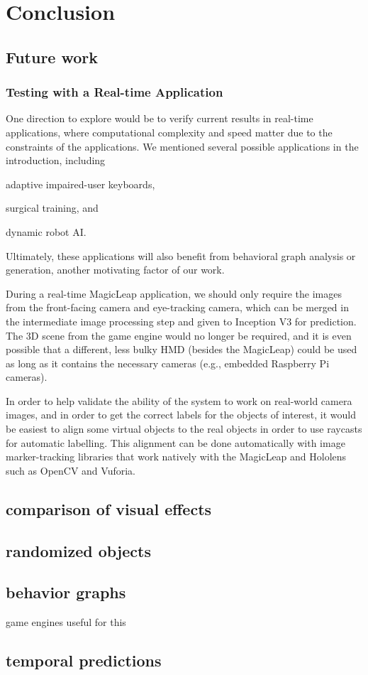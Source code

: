 \section{Conclusion}

\subsection{Future work}

\subsubsection{Testing with a Real-time Application}

One direction to explore would be to verify current results in real-time
applications, where computational complexity and speed matter due to the
constraints of the applications. We mentioned several possible applications in
the introduction, including
\begin{inlist}
\item adaptive impaired-user keyboards,
\item surgical training, and
\item dynamic robot AI\@.
\end{inlist}
Ultimately, these applications will also benefit from behavioral graph analysis
or generation, another motivating factor of our work.

During a real-time MagicLeap application, we should only require the images from
the front-facing camera and eye-tracking camera, which can be merged in the
intermediate image processing step and given to Inception V3 for prediction. The
3D scene from the game engine would no longer be required, and it is even
possible that a different, less bulky HMD (besides the MagicLeap) could be used
as long as it contains the necessary cameras (e.g., embedded Raspberry Pi
cameras).

In order to help validate the ability of the system to work on real-world camera
images, and in order to get the correct labels for the objects of interest, it
would be easiest to align some virtual objects to the real objects in order to
use raycasts for automatic labelling. This alignment can be done automatically
with image marker-tracking libraries that work natively with the MagicLeap and
Hololens such as OpenCV and Vuforia.

\subsection{comparison of visual effects}
\subsection{randomized objects}
\subsection{behavior graphs}
game engines useful for this
\subsection{temporal predictions}